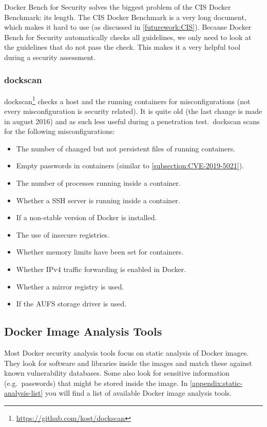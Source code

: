 \medskip

Docker Bench for Security solves the biggest problem of the CIS Docker Benchmark: its length. The CIS Docker Benchmark is a very long document, which makes it hard to use (as discussed in \autoref{futurework:CIS}). Because Docker Bench for Security automatically checks all guidelines, we only need to look at the guidelines that do not pass the check. This makes it a very helpful tool during a security assessment.

\subsubsection{dockscan}
dockscan\footnote{\url{https://github.com/kost/dockscan}} checks a host and the running containers for misconfigurations (not every misconfiguration is security related). It is quite old (the last change is made in august 2016) and as such less useful during a penetration test.\ dockscan scans for the following misconfigurations:
\begin{itemize}
    \item The number of changed but not persistent files of running containers.
    \item Empty passwords in containers (similar to \autoref{subsection:CVE-2019-5021}).
    \item The number of processes running inside a container.
    \item Whether a SSH server is running inside a container.
    \item If a non-stable version of Docker is installed.
    \item The use of insecure registries.
    \item Whether memory limits have been set for containers.
    \item Whether IPv4 traffic forwarding is enabled in Docker.
    \item Whether a mirror registry is used.
    \item If the AUFS storage driver is used.
\end{itemize}

\subsection{Docker Image Analysis Tools}\label{subsection:image-analysis-tools}
Most Docker security analysis tools focus on static analysis of Docker images. They look for software and libraries inside the images and match these against known vulnerability databases. Some also look for sensitive information (e.g.\ passwords) that might be stored inside the image. In \autoref{appendix:static-analysis-list} you will find a list of available Docker image analysis tools.


